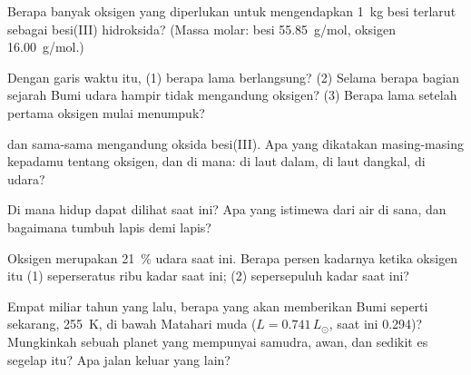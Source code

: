 \begin{exercise}[$\star\star$]\label{exo:g12:early-earth:7}
Berapa banyak oksigen yang diperlukan untuk mengendapkan \qty{1}{kg} besi
terlarut sebagai besi(III) hidroksida? (Massa molar: besi \qty{55.85}{g/mol},
oksigen \qty{16.00}{g/mol}.)
\end{exercise}

\begin{exercise}[$\star\star$]\label{exo:g12:early-earth:8}
Dengan garis waktu itu, (1) berapa lama  berlangsung?
(2) Selama berapa bagian sejarah Bumi udara hampir tidak mengandung oksigen?
(3) Berapa lama setelah  pertama oksigen mulai menumpuk?
\end{exercise}

\begin{exercise}[$\star\star$]\label{exo:g12:early-earth:9}
 dan  sama-sama mengandung oksida besi(III).
Apa yang dikatakan masing-masing kepadamu tentang oksigen, dan di mana: di laut
dalam, di laut dangkal, di udara?
\end{exercise}

\begin{exercise}[$\star\star$]\label{exo:g12:early-earth:10}
Di mana  hidup dapat dilihat saat ini? Apa yang istimewa dari air di
sana, dan bagaimana  tumbuh lapis demi lapis?
\end{exercise}

\begin{exercise}[$\star\star$]\label{exo:g12:early-earth:11}
Oksigen merupakan \qty{21}{\percent} udara saat ini. Berapa persen kadarnya
ketika oksigen itu (1) seperseratus ribu kadar saat ini; (2) sepersepuluh kadar
saat ini?
\end{exercise}

\begin{exercise}[$\star\star\star$]\label{exo:g12:early-earth:12}
Empat miliar tahun yang lalu,  berapa yang akan memberikan  Bumi seperti sekarang, \qty{255}{K}, di bawah Matahari muda
($L = 0.741\,L_\odot$,  saat ini 0.294)? Mungkinkah sebuah planet yang
mempunyai samudra, awan, dan sedikit es segelap itu? Apa jalan keluar yang
lain?
\end{exercise}

